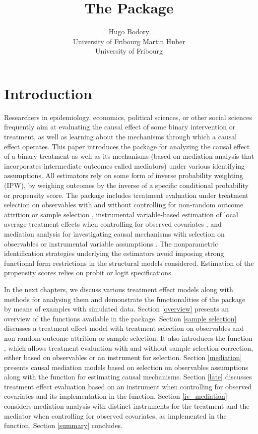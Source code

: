 \documentclass[nojss]{jss}
\author{Hugo Bodory\\University of Fribourg
  \And Martin Huber\\University of Fribourg}
\title{The \pkg{causalweight} Package}
\begin{document}




\section{Introduction}

Researchers in epidemiology, economics, political sciences, or other social sciences frequently aim at evaluating the causal effect of some binary intervention or treatment, as well as learning about the mechanisms through which a causal effect operates. This paper introduces the  package  for analyzing the causal effect of a binary treatment as well as its mechanisms (based on mediation analysis that incorporates intermediate outcomes called mediators) under various identifying assumptions.  All estimators rely on some form of inverse probability weighting (IPW), by weighing outcomes by the inverse of a specific conditional probability or propensity score. The  package includes treatment evaluation under treatment selection on observables with and without controlling for non-random outcome attrition or sample selection   \citep{Hu12,Hu14}, instrumental variable-based estimation of local average  treatment effects when controlling for observed covariates \citep{Fr07}, and mediation analysis for investigating causal mechanisms with selection on observables or instrumental variable assumptions \citep{Hu2014, FrHu17}. The nonparametric identification strategies underlying the estimators avoid imposing strong functional form restrictions in the structural models considered. Estimation of the propensity scores relies on probit or logit specifications.

In the next chapters, we discuss various treatment effect models along with methods for analysing them and demonstrate the functionalities of the  package  by means of examples with simulated data. Section \ref{overview} presents an overview of the functions available in the  package. Section \ref{sample selection} discusses a treatment effect model with treatment selection on observables and non-random outcome attrition or sample selection. It also introduces the function , which allows treatment evaluation with and without sample selection correction, either based on observables or an instrument for selection. Section \ref{mediation} presents causal mediation models based on selection on observables assumptions along with the  function for estimating causal mechanisms. Section \ref{late} discusses treatment effect evaluation based on an instrument when controlling for observed covariates and its implementation in the  function. Section \ref{iv_mediation} considers mediation analysis with distinct instruments for the treatment and the mediator when controlling for observed covariates, as implemented in the  function. Section \ref{summary} concludes.
\end{document}
